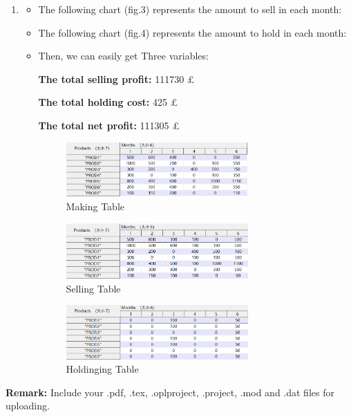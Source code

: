\documentclass[12pt,a4paper]{article}
\makeatletter
\newtheorem*{solution}{Solution}
\theoremstyle{definition}
\renewenvironment{solution}[1][Solution] {\par\pushQED{\qed}\normalfont\topsep6\p@\@plus6\p@\relax\trivlist\item[\hskip\labelsep\bfseries#1\@addpunct{.}]\ignorespaces}{\popQED\endtrivlist\@endpefalse} \makeatother
\makeatother
\begin{document}
\begin{enumerate}
\begin{solution}
\begin{itemize}
\begin{itemize}
			\item  The following chart (fig.3) represents the amount to sell in each month:
			
			
			\item  The following chart (fig.4) represents the  amount to hold in each month:
			
			\item Then, we can easily get Three variables:
			
			\textbf{The total selling profit:} 111730 \pounds
			
			\textbf{The total holding cost:} 425 \pounds
			
			\textbf{The total net profit:} 111305 \pounds
			\begin{figure}[hbtp]
				\centering
				\includegraphics[width=0.7\textwidth]{2.png}
				\caption{Making Table}
			\end{figure}
		
	
	
		\begin{figure}[hbtp]
			\centering
			\includegraphics[width=0.7\textwidth]{3.png}
			\caption{Selling Table}
		\end{figure}
		
			
			
		\begin{figure}[hbtp]
			\centering
			\includegraphics[width=0.7\textwidth]{4.png}
			\caption{Holdinging Table}
		\end{figure}
		
		\end{itemize}
	\end{itemize}
\end{solution}
	
\end{enumerate}



\textbf{Remark:} Include your .pdf, .tex, .oplproject, .project, .mod and .dat files for uploading.


\end{document}

